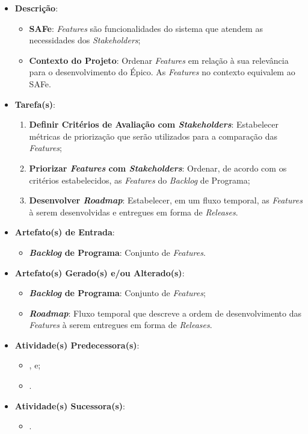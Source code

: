 				\begin{itemize}
					\item{\textbf{Descrição}:
						\begin{itemize}
							\item{\textbf{SAFe}: \emph{Features} são funcionalidades do sistema que atendem as necessidades dos \emph{Stakeholders};}
							\item{\textbf{Contexto do Projeto}: Ordenar \emph{Features} em relação à sua relevância para o desenvolvimento do Épico. As \emph{Features} no contexto equivalem ao SAFe.}
						\end{itemize}}
					\item{\textbf{Tarefa(s)}:
						\begin{enumerate}
							\item{\textbf{Definir Critérios de Avaliação com \emph{Stakeholders}}: Estabelecer métricas de priorização que serão utilizados para a comparação das \emph{Features};}
							\item{\textbf{Priorizar \emph{Features} com \emph{Stakeholders}}: Ordenar, de acordo com os critérios estabelecidos, as \emph{Features} do \emph{Backlog} de Programa;}
							\item{\textbf{Desenvolver \emph{Roadmap}}: Estabelecer, em um fluxo temporal, as \emph{Features} à serem desenvolvidas e entregues em forma de \emph{Releases}.}
						\end{enumerate}}
					\item{\textbf{Artefato(s) de Entrada}:
						\begin{itemize}
							\item{\textbf{\emph{Backlog} de Programa}: Conjunto de \emph{Features}.}
						\end{itemize}}
					\item{\textbf{Artefato(s) Gerado(s) e/ou Alterado(s)}:
						\begin{itemize}
							\item{\textbf{\emph{Backlog} de Programa}: Conjunto de \emph{Features};}
							\item{\textbf{\emph{Roadmap}}: Fluxo temporal que descreve a ordem de desenvolvimento das \emph{Features} à serem entregues em forma de \emph{Releases}.}
						\end{itemize}}
					\item{\textbf{Atividade(s) Predecessora(s)}:
						\begin{itemize}
							\item{, e;}
							\item{.}
						\end{itemize}}
					\item{\textbf{Atividade(s) Sucessora(s)}:
						\begin{itemize}
							\item{.}
						\end{itemize}}
				\end{itemize}


